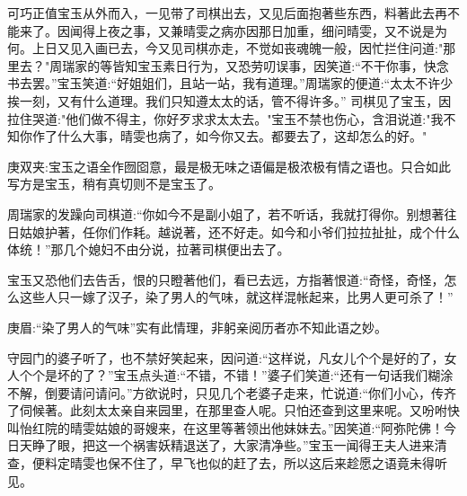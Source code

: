 \begin{parag}
    可巧正值宝玉从外而入，一见带了司棋出去，又见后面抱著些东西，料著此去再不能来了。因闻得上夜之事，又兼晴雯之病亦因那日加重，细问晴雯，又不说是为何。上日又见入画已去，今又见司棋亦走，不觉如丧魂魄一般，因忙拦住问道:"那里去？"周瑞家的等皆知宝玉素日行为，又恐劳叨误事，因笑道:“不干你事，快念书去罢。”宝玉笑道:“好姐姐们，且站一站，我有道理。”周瑞家的便道:“太太不许少挨一刻，又有什么道理。我们只知遵太太的话，管不得许多。” 司棋见了宝玉，因拉住哭道:"他们做不得主，你好歹求求太太去。"宝玉不禁也伤心，含泪说道:"我不知你作了什么大事，晴雯也病了，如今你又去。都要去了，这却怎么的好。"\begin{note}庚双夹:宝玉之语全作囫囵意，最是极无味之语偏是极浓极有情之语也。只合如此写方是宝玉，稍有真切则不是宝玉了。\end{note}周瑞家的发躁向司棋道:“你如今不是副小姐了，若不听话，我就打得你。别想著往日姑娘护著，任你们作耗。越说著，还不好走。如今和小爷们拉拉扯扯，成个什么体统！”那几个媳妇不由分说，拉著司棋便出去了。
\end{parag}


\begin{parag}
    宝玉又恐他们去告舌，恨的只瞪著他们，看已去远，方指著恨道:“奇怪，奇怪，怎么这些人只一嫁了汉子，染了男人的气味，就这样混帐起来，比男人更可杀了！”\begin{note}庚眉:“染了男人的气味”实有此情理，非躬亲阅历者亦不知此语之妙。\end{note}守园门的婆子听了，也不禁好笑起来，因问道:“这样说，凡女儿个个是好的了，女人个个是坏的了？”宝玉点头道:“不错，不错！”婆子们笑道:“还有一句话我们糊涂不解，倒要请问请问。”方欲说时，只见几个老婆子走来，忙说道:“你们小心，传齐了伺候著。此刻太太亲自来园里，在那里查人呢。只怕还查到这里来呢。又吩咐快叫怡红院的晴雯姑娘的哥嫂来，在这里等著领出他妹妹去。”因笑道:“阿弥陀佛！今日天睁了眼，把这一个祸害妖精退送了，大家清净些。”宝玉一闻得王夫人进来清查，便料定晴雯也保不住了，早飞也似的赶了去，所以这后来趁愿之语竟未得听见。
\end{parag}


